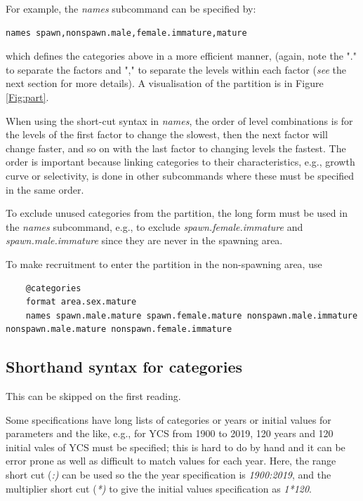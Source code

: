 For example, the \textit{names} subcommand can be specified by:

{\small{\begin{verbatim}names spawn,nonspawn.male,female.immature,mature
\end{verbatim}}}

which defines the categories above in a more efficient manner, (again, note the "." to separate the factors and "," to separate the levels within each factor (\textit{see} the next section for more details). A visualisation of the partition is in Figure \ref{Fig:part}.

When using the short-cut syntax in \textit{names}, the order of level combinations is for the levels of the first factor to change the slowest, then the next factor will change faster, and so on with the last factor to changing levels the fastest. The order is important because linking categories to their characteristics, e.g., growth curve or selectivity, is done in other subcommands where these must be specified in the same order.

To exclude unused categories from the partition, the long form must be used in the \textit{names} subcommand, e.g., to exclude  \textit{spawn.female.immature} and \textit{spawn.male.immature} since they are never in the spawning area.

To make recruitment to enter the partition in  the non-spawning area, use

{\small{\begin{lstlisting}
	@categories
	format area.sex.mature
	names spawn.male.mature spawn.female.mature nonspawn.male.immature nonspawn.male.mature nonspawn.female.immature   
\end{lstlisting}}}

\subsection{Shorthand syntax for categories}\label{sec:ShorthandSyntax-section}

This can be skipped on the first reading.

Some specifications have long lists of categories or years or initial values for parameters and the like, e.g., for YCS from 1900 to 2019, 120 years and 120 initial vales of YCS must be specified; this is hard to do by hand and it can be error prone as well as difficult to match values for each year. Here, the range short cut (\textit{:)} can be used so the  the year specification is \textit{1900:2019}, and the multiplier short cut (\textit{*)} to give the initial values specification as \textit{1*120}.

